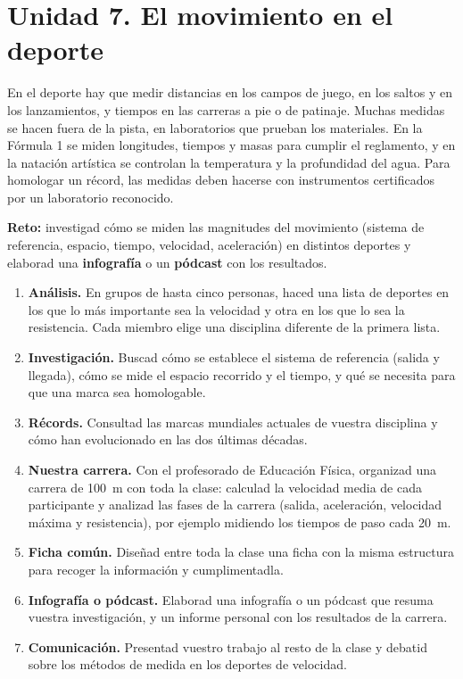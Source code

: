 \section{Unidad 7. El movimiento en el deporte}

En el deporte hay que medir distancias en los campos de juego, en los saltos y en los lanzamientos, y tiempos en las carreras a pie o de patinaje. Muchas medidas se hacen fuera de la pista, en laboratorios que prueban los materiales. En la Fórmula 1 se miden longitudes, tiempos y masas para cumplir el reglamento, y en la natación artística se controlan la temperatura y la profundidad del agua. Para homologar un récord, las medidas deben hacerse con instrumentos certificados por un laboratorio reconocido.

\begin{marker}
    \textbf{Reto:} investigad cómo se miden las magnitudes del movimiento (sistema de referencia, espacio, tiempo, velocidad, aceleración) en distintos deportes y elaborad una \textbf{infografía} o un \textbf{pódcast} con los resultados.
\end{marker}

\begin{enumerate}[label=\numberballred]
    \item \textbf{Análisis.} En grupos de hasta cinco personas, haced una lista de deportes en los que lo más importante sea la velocidad y otra en los que lo sea la resistencia. Cada miembro elige una disciplina diferente de la primera lista.
    \item \textbf{Investigación.} Buscad cómo se establece el sistema de referencia (salida y llegada), cómo se mide el espacio recorrido y el tiempo, y qué se necesita para que una marca sea homologable.
    \item \textbf{Récords.} Consultad las marcas mundiales actuales de vuestra disciplina y cómo han evolucionado en las dos últimas décadas.
    \item \textbf{Nuestra carrera.} Con el profesorado de Educación Física, organizad una carrera de \qty{100}{\m} con toda la clase: calculad la velocidad media de cada participante y analizad las fases de la carrera (salida, aceleración, velocidad máxima y resistencia), por ejemplo midiendo los tiempos de paso cada \qty{20}{\m}.
    \item \textbf{Ficha común.} Diseñad entre toda la clase una ficha con la misma estructura para recoger la información y cumplimentadla.
    \item \textbf{Infografía o pódcast.} Elaborad una infografía o un pódcast que resuma vuestra investigación, y un informe personal con los resultados de la carrera.
    \item \textbf{Comunicación.} Presentad vuestro trabajo al resto de la clase y debatid sobre los métodos de medida en los deportes de velocidad.
\end{enumerate}

